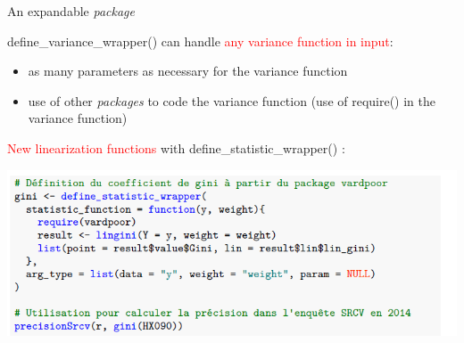 \documentclass[xcolor=dvipsnames]{beamer}
\begin{document}
\begin{frame}{An expandable \textit{package}}

define\_variance\_wrapper() can handle \textcolor{red}{any variance function in input}: 
\vspace{0.2cm}
\begin{itemize}
    \item as many parameters as necessary for the variance function
    \vspace{0.1 cm}
    \item use of other \textit{packages} to code the variance function (use of require() in the variance function)
\end{itemize}

\vspace{0.2cm}

\textcolor{red}{New linearization functions} with define\_statistic\_wrapper() :

\begin{center}
    \includegraphics[width = 10 cm]{gini.png}
\end{center}    

\end{frame}
\end{document}
